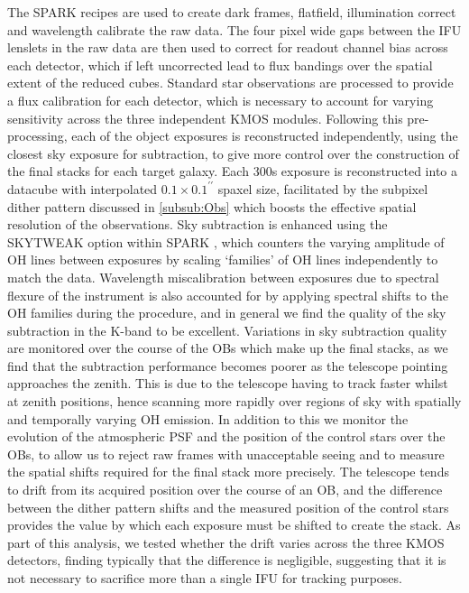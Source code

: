 \documentclass[a4paper,fleqn,usenatbib]{mn2e}
\begin{document}
The SPARK recipes are used to create dark frames, flatfield, illumination correct and wavelength calibrate the raw data.
The four pixel wide gaps between the IFU lenslets in the raw data are then used to correct for readout channel bias across each detector, which if left uncorrected lead to flux bandings over the spatial extent of the reduced cubes.
Standard star observations are processed to provide a flux calibration for each detector, which is necessary to account for varying sensitivity across the three independent KMOS modules. 
Following this pre-processing, each of the object exposures is reconstructed independently, using the closest sky exposure for subtraction, to give more control over the construction of the final stacks for each target galaxy.
Each 300s exposure is reconstructed into a datacube with interpolated $0.1\times0.1^{\prime\prime}$ spaxel size, facilitated by the subpixel dither pattern discussed in \cref{subsub:Obs} which boosts the effective spatial resolution of the observations.
Sky subtraction is enhanced using the SKYTWEAK option within SPARK \citep{Davies2007}, which counters the varying amplitude of OH lines between exposures by scaling `families' of OH lines independently to match the data.
Wavelength miscalibration between exposures due to spectral flexure of the instrument is also accounted for by applying spectral shifts to the OH families during the procedure, and in general we find the quality of the sky subtraction in the K-band to be excellent. %
Variations in sky subtraction quality are monitored over the course of the OBs which make up the final stacks, as we find that the subtraction performance becomes poorer as the telescope pointing approaches the zenith.
This is due to the telescope having to track faster whilst at zenith positions, hence scanning more rapidly over regions of sky with spatially and temporally varying OH emission.
In addition to this we monitor the evolution of the atmospheric PSF and the position of the control stars over the OBs, to allow us to reject raw frames with unacceptable seeing and to measure the spatial shifts required for the final stack more precisely.
The telescope tends to drift from its acquired position over the course of an OB, and the difference between the dither pattern shifts and the measured position of the control stars provides the value by which each exposure must be shifted to create the stack. %
As part of this analysis, we tested whether the drift varies across the three KMOS detectors, finding typically that the difference is negligible, suggesting that it is not necessary to sacrifice more than a single IFU for tracking purposes.
\end{document}
